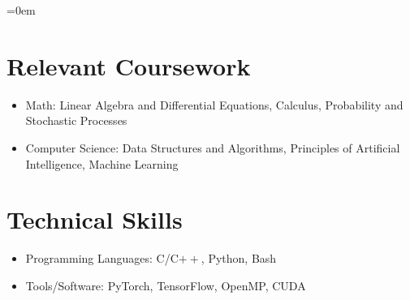 \documentclass{article}
\begin{document}
\begin{list} {}{\leftmargin=0em}
%

\end{list}

\section*{Relevant Coursework}
\begin{itemize}[noitemsep,nolistsep]
\item
    Math: Linear Algebra and Differential Equations, Calculus, Probability and
        Stochastic Processes
\item
    Computer Science: Data Structures and Algorithms, Principles of Artificial Intelligence, Machine Learning
\end{itemize}

\section*{Technical Skills}
\begin{itemize}[noitemsep,nolistsep]
\item
    Programming Languages: C/C$++$, Python, Bash
\item
    Tools/Software: PyTorch, TensorFlow, OpenMP, CUDA
\end{itemize}

\end{document}
